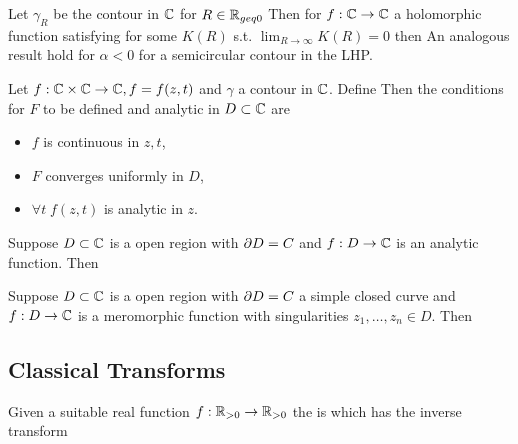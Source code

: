 \documentclass{article}
\begin{document}
\begin{lemma}\label{lemma:BVP:JordansLemma}
Let $\gamma_R$ be the contour in $\mathbb{C}$ for $R\in\mathbb{R}_{geq 0}$
Then for $f:\mathbb{C}\to\mathbb{C}$ a holomorphic function satisfying 
for some $K(R)$ s.t. $\lim_{R\to\infty} K(R) = 0$ then 
An analogous result hold for $\alpha <0$ for a semicircular contour in the LHP. 
\end{lemma}

\begin{theorem}\label{thm:BVP:AnalyticIntegral}
Let $f : \mathbb{C} \times \mathbb{C} \to \mathbb{C}, f=f(z,t)$ and $\gamma$ a contour in $\mathbb{C}$. Define
Then the conditions for $F$ to be defined and analytic in $D \subset \mathbb{C}$ are 
\begin{itemize}
    \item $f$ is continuous in $z,t$,
    \item $F$ converges uniformly in $D$,
    \item $\forall t \; f(z,t)$ is analytic in $z$. 
\end{itemize}
\end{theorem}

\begin{theorem}\label{thm:BVP:Cauchy}
Suppose $D\subset\mathbb{C}$ is a open region with  $\partial D = C$ and $f:D \to \mathbb{C}$ is an analytic function. Then 
\end{theorem}

\begin{theorem}
Suppose $D\subset\mathbb{C}$ is a open region with  $\partial D = C$ a simple closed curve and $f:D \to \mathbb{C}$ is a meromorphic function with singularities $z_1, \dots, z_n \in D$. Then 
\end{theorem}
\subsection{Classical Transforms}

\begin{definition}
Given a suitable real function $f : \mathbb{R}_{>0} \to \mathbb{R}_{>0}$ the  is 
which has the inverse transform 
\end{definition}
\end{document}
